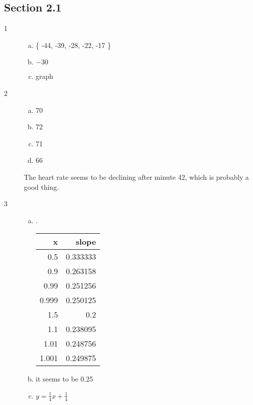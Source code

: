 \documentclass[letterpaper, landscape]{exam}
\begin{document}
    \subsection{Section 2.1}
    \begin{description}

      \item[1]
        \begin{enumerate}[(a)]
          \item \{ -44, -39, -28, -22, -17 \}
          \item $-30$
          \item graph
        \end{enumerate}

      \item[2]
        \begin{enumerate}[(a)]
          \item 70
          \item 72
          \item 71
          \item 66
        \end{enumerate}

        The heart rate seems to be declining after minute 42, which is probably
        a good thing.

      \item[3]
        \begin{enumerate}[(a)]
          \item .

            \begin{tabular}[H]{rr}
              \toprule
              x     & slope \\
              \midrule
              0.5   & 0.333333 \\
              0.9   & 0.263158 \\
              0.99  & 0.251256 \\
              0.999 & 0.250125 \\
              1.5   & 0.2 \\
              1.1   & 0.238095 \\
              1.01  & 0.248756 \\
              1.001 & 0.249875 \\
            \end{tabular}

          \item it seems to be 0.25

          \item $y = \frac{1}{4} x + \frac{1}{4}$


\end{enumerate}
\end{description}
\end{document}

